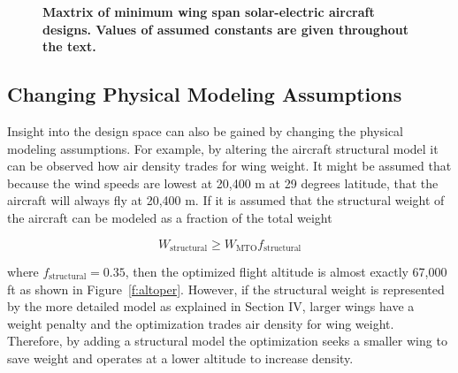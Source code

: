  \begin{figure}[H]
 \begin{subfigmatrix}{3}%
 \end{subfigmatrix}
 \caption{\textbf{Maxtrix of minimum wing span solar-electric aircraft designs. Values of assumed constants are given throughout the text.}}
 \label{f:solarcontours}
\end{figure}

\subsection{Changing Physical Modeling Assumptions}

Insight into the design space can also be gained by changing the physical modeling assumptions.
For example, by altering the aircraft structural model it can be observed how air density trades for wing weight. 
It might be assumed that because the wind speeds are lowest at 20,400 m at 29 degrees latitude, that the aircraft will always fly at 20,400 m.  
If it is assumed that the structural weight of the aircraft can be modeled as a fraction of the total weight 

\begin{equation}
    W_{\text{structural}} \geq W_{\text{MTO}} f_{\text{structural}}
\end{equation}

where $f_{\text{structural}} = 0.35$, then the optimized flight altitude is almost exactly 67,000 ft as shown in Figure~\ref{f:altoper}.  
However, if the structural weight is represented by the more detailed model as explained in Section IV, larger wings have a weight penalty and the optimization trades air density for wing weight.
Therefore, by adding a structural model the optimization seeks a smaller wing to save weight and operates at a lower altitude to increase density. 

